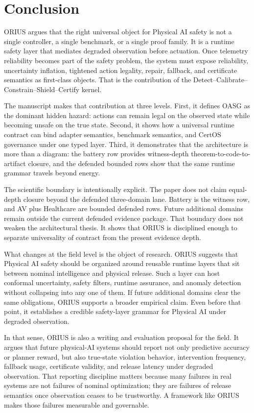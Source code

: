 \section{Conclusion}
\label{sec:prof-conclusion}

ORIUS argues that the right universal object for Physical AI safety is not a single
controller, a single benchmark, or a single proof family. It is a runtime safety layer
that mediates degraded observation before actuation. Once telemetry reliability becomes
part of the safety problem, the system must expose reliability, uncertainty inflation,
tightened action legality, repair, fallback, and certificate semantics as first-class
objects. That is the contribution of the Detect--Calibrate--Constrain--Shield--Certify
kernel.

The manuscript makes that contribution at three levels. First, it defines OASG as the
dominant hidden hazard: actions can remain legal on the observed state while becoming
unsafe on the true state. Second, it shows how a universal runtime contract can bind
adapter semantics, benchmark semantics, and CertOS governance under one typed layer.
Third, it demonstrates that the architecture is more than a diagram: the battery row
provides witness-depth theorem-to-code-to-artifact closure, and the defended bounded
rows show that the same runtime grammar travels beyond energy.

The scientific boundary is intentionally explicit. The paper does not claim equal-depth
closure beyond the defended three-domain lane. Battery is the witness row, and AV plus
Healthcare are bounded defended rows. Future additional domains remain outside the
current defended evidence package. That boundary does not weaken the architectural
thesis. It shows that ORIUS is disciplined enough to separate universality of contract
from the present evidence depth.

What changes at the field level is the object of research. ORIUS suggests that Physical
AI safety should be organized around reusable runtime layers that sit between nominal
intelligence and physical release. Such a layer can host conformal uncertainty, safety
filters, runtime assurance, and anomaly detection without collapsing into any one of
them. If future additional domains clear the same obligations, ORIUS supports a
broader empirical claim. Even before that point, it establishes a credible
safety-layer grammar for Physical AI under degraded observation.

In that sense, ORIUS is also a writing and evaluation proposal for the field. It argues
that future physical-AI systems should report not only predictive accuracy or planner
reward, but also true-state violation behavior, intervention frequency, fallback usage,
certificate validity, and release latency under degraded observation. That reporting
discipline matters because many failures in real systems are not failures of nominal
optimization; they are failures of release semantics once observation ceases to be
trustworthy. A framework like ORIUS makes those failures measurable and governable.
